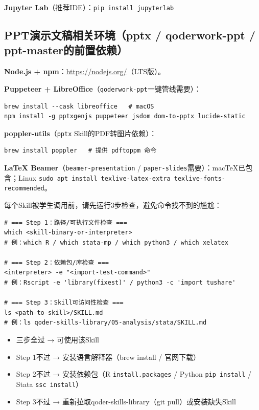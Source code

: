 \textbf{Jupyter Lab}（推荐IDE）：\texttt{pip install jupyterlab}

\subsection{PPT演示文稿相关环境（pptx / qoderwork-ppt / ppt-master的前置依赖）}

\textbf{Node.js + npm}：\url{https://nodejs.org/}（LTS版）。

\textbf{Puppeteer + LibreOffice}（\texttt{qoderwork-ppt}一键管线需要）：

\begin{lstlisting}[style=shell]
brew install --cask libreoffice   # macOS
npm install -g pptxgenjs puppeteer jsdom dom-to-pptx lucide-static
\end{lstlisting}

\textbf{poppler-utils}（\texttt{pptx} Skill的PDF转图片依赖）：

\begin{lstlisting}[style=shell]
brew install poppler   # 提供 pdftoppm 命令
\end{lstlisting}

\textbf{LaTeX Beamer}（\texttt{beamer-presentation} / \texttt{paper-slides}需要）：macTeX已包含；Linux \texttt{sudo apt install texlive-latex-extra texlive-fonts-recommended}。

\begin{warningbox}
每个Skill被学生调用前，请先运行3步检查，避免命令找不到的尴尬：

\begin{lstlisting}[style=shell]
# === Step 1：路径/可执行文件检查 ===
which <skill-binary-or-interpreter>
# 例：which R / which stata-mp / which python3 / which xelatex

# === Step 2：依赖包/库检查 ===
<interpreter> -e "<import-test-command>"
# 例：Rscript -e 'library(fixest)' / python3 -c 'import tushare'

# === Step 3：Skill可访问性检查 ===
ls <path-to-skill>/SKILL.md
# 例：ls qoder-skills-library/05-analysis/stata/SKILL.md
\end{lstlisting}

\begin{itemize}[leftmargin=1em]
  \item 三步全过 → 可使用该Skill
  \item Step 1不过 → 安装语言解释器（brew install / 官网下载）
  \item Step 2不过 → 安装依赖包（R \texttt{install.packages} / Python \texttt{pip install} / Stata \texttt{ssc install}）
  \item Step 3不过 → 重新拉取qoder-skills-library（git pull）或安装缺失Skill
\end{itemize}
\end{warningbox}

